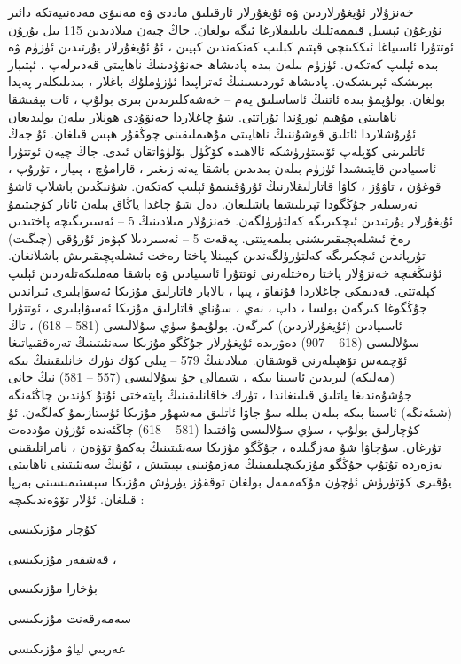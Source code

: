 \documentclass[a4paper]{article}
\begin{document}
\begin{flushright}
خەنزۇلار ئۇيغۇرلاردىن ۋە ئۇيغۇرلار ئارقىلىق ماددى ۋە مەنىۋى مەدەنىيەتكە دائىر نۇرغۇن ئېسىل قىممەتلىك بايلىقلارغا ئىگە بولغان. جاڭ چيەن مىلادىدىن 115 يىل بۇرۇن ئوتتۇرا ئاسىياغا ئىككىنچى قېتىم كېلىپ كەتكەندىن كېيىن ، ئۇ ئۇيغۇرلار يۇرتىدىن ئۈزۈم ۋە بىدە ئېلىپ كەتكەن. ئۈزۈم بىلەن بىدە پادىشاھ خەنۋۇدىنىڭ ناھايىتى قەدىرلەپ ، ئېتىبار بېرىشكە ئېرىشكەن. پادىشاھ ئوردىسىنىڭ ئەتراپىدا ئۈزۈملۇك باغلار ، بىدىلىكلەر پەيدا بولغان. بولۇپمۇ بىدە ئاتنىڭ ئاساسلىق يەم – خەشەكلىرىدىن بىرى بولۇپ ، ئات بېقىشقا ناھايىتى مۇھىم ئورۇندا تۇراتتى. شۇ چاغلاردا خەنۋۇدى ھونلار بىلەن بولىدىغان ئۇرۇشلاردا ئاتلىق قوشۇننىڭ ناھايىتى مۇھىملىقىنى چوڭقۇر ھېس قىلغان. ئۇ جەڭ ئاتلىرىنى كۆپلەپ ئۆستۈرۈشكە ئالاھىدە كۆڭۈل بۆلۈۋاتقان ئىدى. جاڭ چيەن ئوتتۇرا ئاسىيادىن قايتىشىدا ئۈزۈم بىلەن بىدىدىن باشقا يەنە زىغىر ، قارامۇچ ، پىياز ، تۇرۇپ ، قوغۇن ، تاۋۇز ، كاۋا قاتارلىقلارنىڭ ئۇرۇقىنىمۇ ئېلىپ كەتكەن. شۇنىڭدىن باشلاپ ئاشۇ نەرسىلەر جۇڭگودا تېرىلىشقا باشلىغان. دەل شۇ چاغدا ياڭاق بىلەن ئانار كۆچىتىمۇ ئۇيغۇرلار يۇرتىدىن ئىچكىرىگە كەلتۈرۈلگەن. خەنزۇلار مىلادىنىڭ 5 – ئەسىرىگىچە پاختىدىن رەخ ئىشلەپچىقىرىشنى بىلمەيتتى. پەقەت 5 – ئەسىردىلا كېۋەز ئۇرۇقى (چىگىت) تۇرپاندىن ئىچكىرىگە كەلتۈرۈلگەندىن كېيىنلا پاختا رەخت ئىشلەپچىقىرىش باشلانغان. ئۇنىڭغىچە خەنزۇلار پاختا رەختلەرنى ئوتتۇرا ئاسىيادىن ۋە باشقا مەملىكەتلەردىن ئېلىپ كېلەتتى. قەدىمكى چاغلاردا قۇنقاۋ ، پىپا ، بالابار قاتارلىق مۇزىكا ئەسۋابلىرى ئىراندىن جۇڭگوغا كىرگەن بولسا ، داپ ، نەي ، سۇناي قاتارلىق مۇزىكا ئەسۋابلىرى ، ئوتتۇرا ئاسىيادىن (ئۇيغۇرلاردىن) كىرگەن. بولۇپمۇ سۈي سۇلالىسى (581 – 618) ، تاڭ سۇلالىسى (618 – 907) دەۋرىدە ئۇيغۇرلار جۇڭگو مۇزىكا سەنئىتىنىڭ تەرەققىياتىغا ئۆچمەس تۆھپىلەرنى قوشقان. مىلادىنىڭ 579 – يىلى كۆك تۈرك خانلىقىنىڭ بىكە (مەلىكە) لىرىدىن ئاسىنا بىكە ، شىمالى جۇ سۇلالىسى (557 – 581) نىڭ خانى جۇشۇەندىغا ياتلىق قىلىنغاندا ، تۈرك خاقانلىقىنىڭ پايتەختى ئۇتۇ كۈندىن چاڭئەنگە (شىئەنگە) ئاسىنا بىكە بىلەن بىللە سۇ جاۋا ئاتلىق مەشھۇر مۇزىكا ئۇستازىمۇ كەلگەن. ئۇ كۇچارلىق بولۇپ ، سۈي سۇلالىسى ۋاقتىدا (581 – 618) چاڭئەندە ئۇزۇن مۇددەت تۇرغان. سۇجاۋا شۇ مەزگىلدە ، جۇڭگو مۇزىكا سەنئىتىنىڭ بەكمۇ تۆۋەن ، نامراتلىقىنى نەزەردە تۇتۇپ جۇڭگو مۇزىكىچىلىقىنىڭ مەزمۇنىنى بېيىتىش ، ئۇنىڭ سەنئىتىنى ناھايىتى يۇقىرى كۆتۈرۈش ئۈچۈن مۇكەممەل بولغان توققۇز يۈرۈش مۇزىكا سېستىمىسىنى بەرپا قىلغان. ئۇلار تۆۋەندىكىچە :



كۇچار مۇزىكىسى

قەشقەر مۇزىكىسى ،

بۇخارا مۇزىكىسى

سەمەرقەنت مۇزىكىسى

غەربىي لياۋ مۇزىكىسى


\end{flushright}
\end{document}

